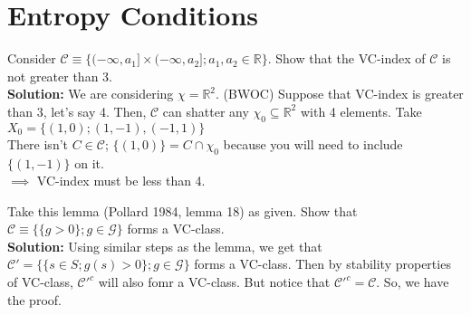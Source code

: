 \documentclass[11pt,letterpaper]{article}                  %
\begin{document}
\bigskip
\begin{problem}

\end{problem}

\bigskip
\section{Entropy Conditions}

\begin{problem} Consider $\mathcal{C}\equiv \{(-\infty, a_1] \times (-\infty, a_2]; a_1,a_2 \in \mathbb{R}\}$. Show that the VC-index of $\mathcal{C}$ is not greater than 3.\\

\textbf{Solution:} We are considering $\chi = \mathbb{R}^2$. (BWOC) Suppose that VC-index is greater than 3, let's say 4. Then, $\mathcal{C}$ can shatter any $\chi_0 \subseteq \mathbb{R}^2$ with 4 elements. Take $X_0 = \{(1,0); (1,-1), (-1,1)\}$\\

There isn't $C \in \mathcal{C}$; $\{(1,0)\} = C \cap \chi_0$ because you will need to include $\{(1,-1)\}$ on it.\\

$\implies$ VC-index must be less than 4.
\end{problem}

\bigskip
\begin{problem} Take this lemma (Pollard 1984, lemma 18) as given. Show that $\mathcal{C}\equiv \{\{g>0\}; g\in \mathcal{G}\}$ forms a VC-class.\\

\textbf{Solution:} Using similar steps as the lemma, we get that $\mathcal{C}' = \{\{s\in S; g(s)>0\}; g \in \mathcal{G}\}$ forms a VC-class. Then by stability properties of VC-class, $\mathcal{C}'^{c}$ will also fomr a VC-class. But notice that $\mathcal{C}'^{c} = \mathcal{C}$. So, we have the proof. 
\end{problem}
\end{document}
